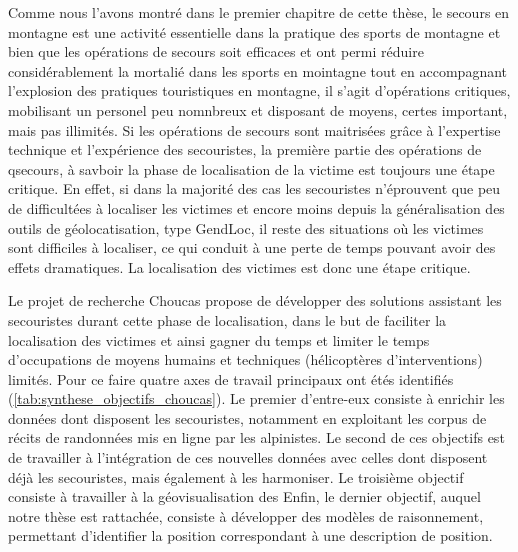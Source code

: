 Comme nous l'avons montré dans le premier chapitre de cette thèse, le
secours en montagne est une activité essentielle dans la pratique des
sports de montagne et bien que les opérations de secours soit
efficaces et ont permi réduire considérablement la mortalié dans les
sports en mointagne tout en accompagnant l'explosion des pratiques
touristiques en montagne, il s'agit d'opérations critiques, mobilisant
un personel peu nomnbreux et disposant de moyens, certes important,
mais pas illimités. Si les opérations de secours sont maitrisées grâce
à l'expertise technique et l'expérience des secouristes, la première
partie des opérations de qsecours, à savboir la phase de localisation
de la victime est toujours une étape critique. En effet, si dans la
majorité des cas les secouristes n'éprouvent que peu de difficultées à
localiser les victimes et encore moins depuis la généralisation des
outils de géolocatisation, type GendLoc, il reste des situations où
les victimes sont difficiles à localiser, ce qui conduit à une perte
de temps pouvant avoir des effets dramatiques. La localisation des
victimes est donc une étape critique.

Le projet de recherche Choucas propose de développer des solutions
assistant les secouristes durant cette phase de localisation, dans le
but de faciliter la localisation des victimes et ainsi gagner du temps
et limiter le temps d'occupations de moyens humains et techniques
(hélicoptères d'interventions) limités. Pour ce faire quatre axes de
travail principaux ont étés identifiés
(\autoref{tab:synthese_objectifs_choucas}). Le premier d'entre-eux
consiste à enrichir les données dont disposent les secouristes,
notamment en exploitant les corpus de récits de randonnées mis en
ligne par les alpinistes. Le second de ces objectifs est de travailler
à l'intégration de ces nouvelles données avec celles dont disposent
déjà les secouristes, mais également à les harmoniser. Le troisième
objectif consiste à travailler à la géovisualisation des Enfin, le
dernier objectif, auquel notre thèse est rattachée, consiste à
développer des modèles de raisonnement, permettant d'identifier la
position correspondant à une description de position.

